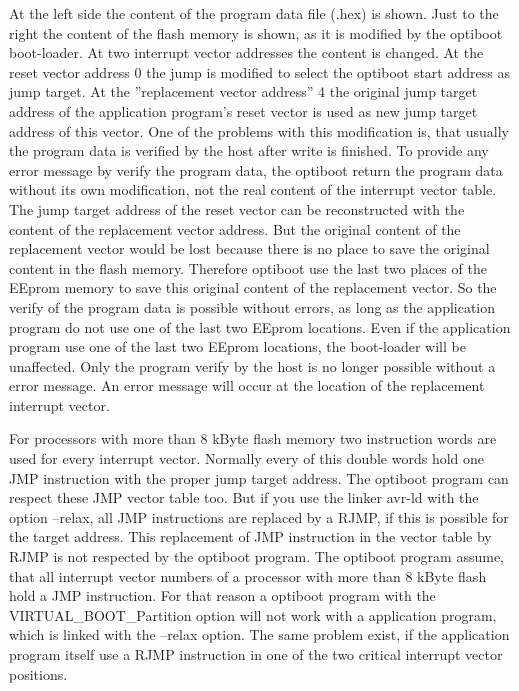 At the left side the content of the program data file (.hex) is shown.
Just to the right the content of the flash memory is shown, as it is modified by the
optiboot boot-loader. At two interrupt vector addresses the content is changed.
At the reset vector address 0 the jump is modified to select the optiboot start address 
as jump target.
At the ''replacement vector address'' 4 the original jump target address of the application
program's reset vector is used as new jump target address of this vector.
One of the problems with this modification is, that usually the program data
is verified by the host after write is finished.
To provide any error message by verify the program data, the optiboot return the
program data without its own modification, not the real content of the interrupt vector table.
The jump target address of the reset vector can be reconstructed with the content
of the replacement vector address.
But the original content of the replacement vector would be lost because there is no
place to save the original content in the flash memory.
Therefore optiboot use the last two places of the EEprom memory to save this original
content of the replacement vector. 
So the verify of the program data is possible without errors, as long as the application
program do not use one of the last two EEprom locations.
Even if the application program use one of the last two EEprom locations,
the boot-loader will be unaffected. Only the program verify by the host is
no longer possible without a error message.
An error message will occur at the location of the replacement interrupt vector.

For processors with more than 8 kByte flash memory two instruction words are used for every
interrupt vector. Normally every of this double words hold one JMP instruction with the
proper jump target address. The optiboot program can respect these JMP vector table too.
But if you use the linker avr-ld with the option --relax, all JMP instructions are replaced
by a RJMP, if this is possible for the target address.
This replacement of JMP instruction in the vector table by RJMP is not respected
by the optiboot program.
The optiboot program assume, that all interrupt vector numbers of a processor with
more than 8 kByte flash hold a JMP instruction.
For that reason a optiboot program with the VIRTUAL\_BOOT\_Partition option will not
work with a application program, which is linked with the --relax option.
The same problem exist, if the application program itself use a RJMP instruction in
one of the two critical interrupt vector positions.

